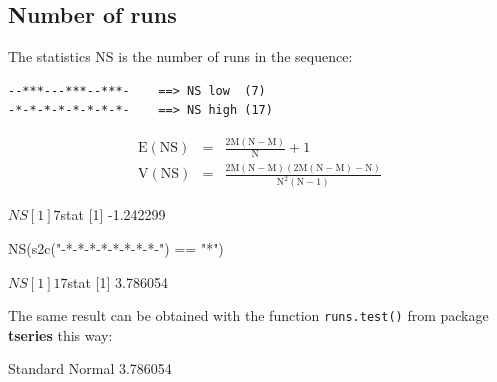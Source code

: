 \documentclass{article}
\begin{document}
\subsection{Number of runs}

The statistics $\mathrm{NS}$ is the number of runs in the sequence:

\begin{verbatim}
--***---***--***-    ==> NS low  (7)
-*-*-*-*-*-*-*-*-    ==> NS high (17)
\end{verbatim}

\begin{eqnarray*}
\mathrm{E(NS)} & = & \mathrm{\frac{2M(N - M)}{N} + 1} \\
\mathrm{V(NS)} & = & \mathrm{\frac{2M(N - M)(2M(N - M) - N)}{N^2(N - 1)}}
\end{eqnarray*}

\begin{Schunk}
\begin{Soutput}
$NS
[1] 7

$stat
[1] -1.242299
\end{Soutput}
\begin{Sinput}
 NS(s2c("-*-*-*-*-*-*-*-*-") == "*")
\end{Sinput}
\begin{Soutput}
$NS
[1] 17

$stat
[1] 3.786054
\end{Soutput}
\end{Schunk}

The same result can be obtained with the function \texttt{runs.test()} from
package \textbf{tseries} \cite{tseries} this way:

\begin{Schunk}
\begin{Soutput}
Standard Normal 
       3.786054 
\end{Soutput}
\end{Schunk}
\end{document}
